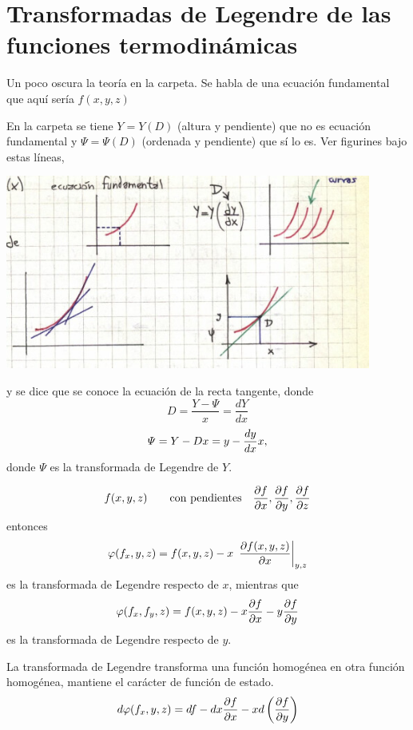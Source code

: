 \documentclass[10pt,oneside]{CBFT_book}
\begin{document}
\section{Transformadas de Legendre de las funciones termodinámicas}

Un poco oscura la teoría en la carpeta. Se habla de una ecuación fundamental que aquí sería
$f(x,y,z)$

En la carpeta se tiene $Y=Y(D)$ (altura y pendiente) que no es ecuación fundamental y $\Psi = \Psi(D)$
(ordenada y pendiente) que sí lo es. Ver figurines bajo estas líneas,

\includegraphics[width=0.90\textwidth]{images/1606329032.jpg}

y se dice que se conoce la ecuación de la recta tangente,
donde 
\[
	D = \frac{Y - \Psi}{x} = \frac{dY}{dx}
\]
\[
	\Psi = Y - Dx = y - \frac{d^{\hspace{-0.05em}} {y}}{d {x}^{\hspace{-0.05em}}} x,
\]
donde $\Psi$ es la transformada de Legendre de $Y$.

\[
	f(x,y,z) \qquad \text{con pendientes} \quad \frac{\partial^{\hspace{-0.05em}} {f}}{\partial {x}^{\hspace{-0.05em}}},\frac{\partial^{\hspace{-0.05em}} {f}}{\partial {y}^{\hspace{-0.05em}}},\frac{\partial^{\hspace{-0.05em}} {f}}{\partial {z}^{\hspace{-0.05em}}}
\]
entonces 
\[
	\varphi(f_x,y,z) = f(x,y,z) - x \: \left.\frac{\partial^{\hspace{-0.05em}} {f(x,y,z)}}{\partial {x}^{\hspace{-0.05em}}}\right|_{{y,z}}
\]
es la transformada de Legendre respecto de $x$, mientras que 
\[
	\varphi(f_x,f_y,z) = f(x,y,z) - x \frac{\partial^{\hspace{-0.05em}} {f}}{\partial {x}^{\hspace{-0.05em}}} - y \frac{\partial^{\hspace{-0.05em}} {f}}{\partial {y}^{\hspace{-0.05em}}}
\]
es la transformada de Legendre respecto de $y$.

La transformada de Legendre transforma una función homogénea en otra función homogénea, mantiene el
carácter de función de estado.
\[
	d\varphi(f_x,y,z) = df - dx \frac{\partial^{\hspace{-0.05em}} {f}}{\partial {x}^{\hspace{-0.05em}}} - x d\left( \frac{\partial^{\hspace{-0.05em}} {f}}{\partial {y}^{\hspace{-0.05em}}} \right)
\]
\end{document}
